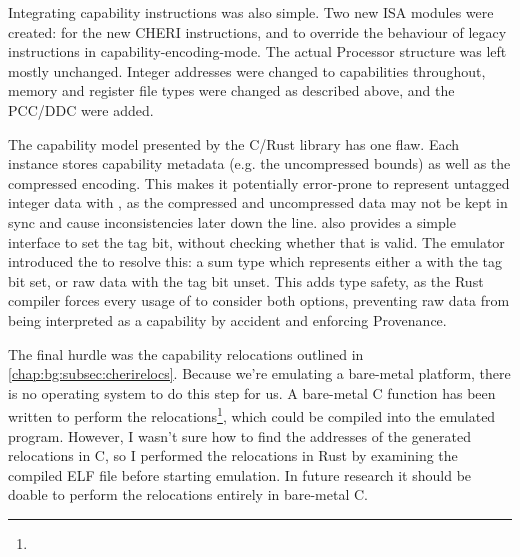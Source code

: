 
Integrating capability instructions was also simple.
Two new ISA modules were created:  for the new CHERI instructions, and  to override the behaviour of legacy instructions in capability-encoding-mode.
The actual Processor structure was left mostly unchanged.
Integer addresses were changed to capabilities throughout,
memory and register file types were changed as described above, and the PCC/DDC were added.

The capability model presented by the C/Rust library has one flaw.\label{safetaggedcap}
Each  instance stores capability metadata (e.g. the uncompressed bounds) as well as the compressed encoding.
This makes it potentially error-prone to represent untagged integer data with , as the compressed and uncompressed data may not be kept in sync and cause inconsistencies later down the line.
 also provides a simple interface to set the tag bit, without checking whether that is valid.
The emulator introduced the  to resolve this: a sum type which represents either a  with the tag bit set, or raw data with the tag bit unset.
This adds type safety, as the Rust compiler forces every usage of  to consider both options, preventing raw data from being interpreted as a capability by accident and enforcing Provenance.

The final hurdle was the capability relocations outlined in \cref{chap:bg:subsec:cherirelocs}.
Because we're emulating a bare-metal platform, there is no operating system to do this step for us.
A bare-metal C function has been written to perform the relocations\footnote{}, which could be compiled into the emulated program.
However, I wasn't sure how to find the addresses of the generated relocations in C, so I performed the relocations in Rust by examining the compiled ELF file before starting emulation.
In future research it should be doable to perform the relocations entirely in bare-metal C.
